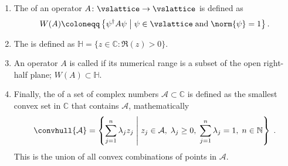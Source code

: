 \begin{enumerate}
\item{
The  of an operator $A \colon \vslattice \rightarrow \vslattice$ is defined as
\begin{align} \label{eq:def:numerical:range}
W(A) \coloneqq \left\{ \psi^\dagger A \psi \; \middle| \; \psi \in \vslattice \; \text{and} \; \norm{\psi} = 1 \right\}.
\end{align}
}
\item{The  is defined as $\mathbb{H} = \{ z \in \mathbb{C} \colon \Re(z) > 0 \}$.}
\item{An operator $A$ is called  if its numerical range is a subset of the open right-half plane; $W(A) \subset \mathbb{H}$.}
\item{
Finally, the  of a set of complex numbers $\mathcal{A} \subset \mathbb{C}$ is defined as the smallest convex set in $\mathbb{C}$ that contains $\mathcal{A}$, mathematically
\begin{equation}
\convhull{\mathcal{A}} = \left\{
    \sum_{j=1}^{n} \lambda_j z_j
    \; \middle| \;
    z_j \in \mathcal{A}, \;
    \lambda_j \geq 0, \;
    \sum_{j=1}^{n} \lambda_j = 1, \;
    n \in \mathbb{N}
\right\} \;.
\end{equation}
This is the union of all convex combinations of points in $\mathcal{A}$.
}
\end{enumerate}

